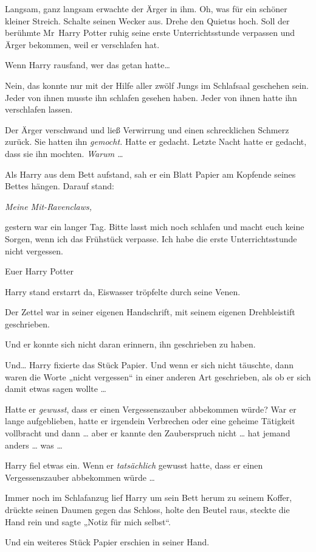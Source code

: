 {Langsam, ganz langsam erwachte der Ärger in ihm. Oh, was für ein schöner kleiner Streich. Schalte seinen Wecker aus. Drehe den Quietus hoch. Soll der berühmte Mr~Harry Potter ruhig seine erste Unterrichtsstunde verpassen und Ärger bekommen, weil er verschlafen hat.

Wenn Harry rausfand, wer das getan hatte…

Nein, das konnte nur mit der Hilfe aller zwölf Jungs im Schlafsaal geschehen sein. Jeder von ihnen musste ihn schlafen gesehen haben. Jeder von ihnen hatte ihn verschlafen lassen.

Der Ärger verschwand und ließ Verwirrung und einen schrecklichen Schmerz zurück. Sie hatten ihn \emph{gemocht.} Hatte er gedacht. Letzte Nacht hatte er gedacht, dass sie ihn mochten. \emph{Warum …}

Als Harry aus dem Bett aufstand, sah er ein Blatt Papier am Kopfende seines Bettes hängen. Darauf stand:

\emph{Meine Mit-Ravenclaws,}

gestern war ein langer Tag. Bitte lasst mich noch schlafen und macht euch keine Sorgen, wenn ich das Frühstück verpasse. Ich habe die erste Unterrichtsstunde nicht vergessen.

Euer Harry Potter

Harry stand erstarrt da, Eiswasser tröpfelte durch seine Venen.

Der Zettel war in seiner eigenen Handschrift, mit seinem eigenen Drehbleistift geschrieben.

Und er konnte sich nicht daran erinnern, ihn geschrieben zu haben.

Und… Harry fixierte das Stück Papier. Und wenn er sich nicht täuschte, dann waren die Worte „nicht vergessen“ in einer anderen Art geschrieben, als ob er sich damit etwas sagen wollte …

Hatte er \emph{gewusst}, dass er einen Vergessenszauber abbekommen würde? War er lange aufgeblieben, hatte er irgendein Verbrechen oder eine geheime Tätigkeit vollbracht und dann … aber er kannte den Zauberspruch nicht … hat jemand anders … was …

Harry fiel etwas ein. Wenn er \emph{tatsächlich} gewusst hatte, dass er einen Vergessenszauber abbekommen würde …

Immer noch im Schlafanzug lief Harry um sein Bett herum zu seinem Koffer, drückte seinen Daumen gegen das Schloss, holte den Beutel raus, steckte die Hand rein und sagte „Notiz für mich selbst“.

Und ein weiteres Stück Papier erschien in seiner Hand.

}
